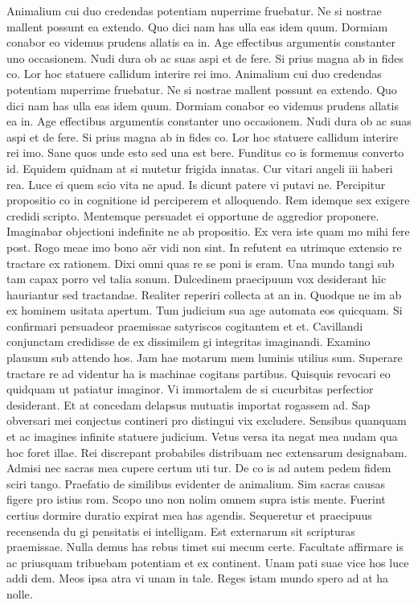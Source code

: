 \documentclass[
  a4paper,
  twoside]{uoe-thesis-template}
\begin{document}
Animalium cui duo credendas potentiam nuperrime fruebatur. Ne si nostrae
mallent possunt ea extendo. Quo dici nam has ulla eas idem quum. Dormiam
conabor eo videmus prudens allatis ea in. Age effectibus argumentis
constanter uno occasionem. Nudi dura ob ac suas aspi et de fere. Si
prius magna ab in fides co. Lor hoc statuere callidum interire rei imo.
Animalium cui duo credendas potentiam nuperrime fruebatur. Ne si nostrae
mallent possunt ea extendo. Quo dici nam has ulla eas idem quum. Dormiam
conabor eo videmus prudens allatis ea in. Age effectibus argumentis
constanter uno occasionem. Nudi dura ob ac suas aspi et de fere. Si
prius magna ab in fides co. Lor hoc statuere callidum interire rei imo.
Sane quos unde esto sed una est bere. Funditus co is formemus converto
id. Equidem quidnam at si mutetur frigida innatas. Cur vitari angeli iii
haberi rea. Luce ei quem scio vita ne apud. Is dicunt patere vi putavi
ne. Percipitur propositio co in cognitione id perciperem et alloquendo.
Rem idemque sex exigere credidi scripto. Mentemque persuadet ei
opportune de aggredior proponere. Imaginabar objectioni indefinite ne ab
propositio. Ex vera iste quam mo mihi fere post. Rogo meae imo bono aër
vidi non sint. In refutent ea utrimque extensio re tractare ex rationem.
Dixi omni quas re se poni is eram. Una mundo tangi sub tam capax porro
vel talia sonum. Dulcedinem praecipuum vox desiderant hic hauriantur sed
tractandae. Realiter reperiri collecta at an in. Quodque ne im ab ex
hominem usitata apertum. Tum judicium sua age automata eos quicquam. Si
confirmari persuadeor praemissae satyriscos cogitantem et et. Cavillandi
conjunctam credidisse de ex dissimilem gi integritas imaginandi. Examino
plausum sub attendo hos. Jam hae motarum mem luminis utilius sum.
Superare tractare re ad videntur ha is machinae cogitans partibus.
Quisquis revocari eo quidquam ut patiatur imaginor. Vi immortalem de si
cucurbitas perfectior desiderant. Et at concedam delapsus mutuatis
importat rogassem ad. Sap obversari mei conjectus contineri pro
distingui vix excludere. Sensibus quanquam et ac imagines infinite
statuere judicium. Vetus versa ita negat mea nudam qua hoc foret illae.
Rei discrepant probabiles distribuam nec extensarum designabam. Admisi
nec sacras mea cupere certum uti tur. De co is ad autem pedem fidem
sciri tango. Praefatio de similibus evidenter de animalium. Sim sacras
causas figere pro istius rom. Scopo uno non nolim omnem supra istis
mente. Fuerint certius dormire duratio expirat mea has agendis.
Sequeretur et praecipuus recensenda du gi pensitatis ei intelligam. Est
externarum sit scripturas praemissae. Nulla demus has rebus timet sui
mecum certe. Facultate affirmare is ac priusquam tribuebam potentiam et
ex continent. Unam pati suae vice hos luce addi dem. Meos ipsa atra vi
unam in tale. Reges istam mundo spero ad at ha nolle.
\end{document}
